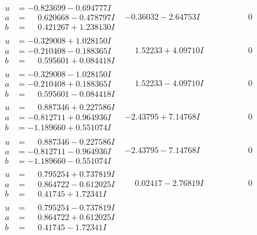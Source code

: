 \documentclass[1p]{elsarticle_modified}
\theoremstyle{definition}
\begin{document}
$$\begin{array}{c|c|c}
\begin{aligned}
u &= -0.823699 - 0.694777 I \\
a &= \phantom{-}0.620668 - 0.478797 I \\
b &= \phantom{-}0.421267 + 1.238130 I\end{aligned}
 & -0.36032 - 2.64753 I & \phantom{-0.000000 } 0 \\ \hline\begin{aligned}
u &= -0.329008 + 1.028150 I \\
a &= -0.210408 - 0.188365 I \\
b &= \phantom{-}0.595601 + 0.084418 I\end{aligned}
 & \phantom{-}1.52233 + 4.09710 I & \phantom{-0.000000 } 0 \\ \hline\begin{aligned}
u &= -0.329008 - 1.028150 I \\
a &= -0.210408 + 0.188365 I \\
b &= \phantom{-}0.595601 - 0.084418 I\end{aligned}
 & \phantom{-}1.52233 - 4.09710 I & \phantom{-0.000000 } 0 \\ \hline\begin{aligned}
u &= \phantom{-}0.887346 + 0.227586 I \\
a &= -0.812711 + 0.964936 I \\
b &= -1.189660 + 0.551074 I\end{aligned}
 & -2.43795 + 7.14768 I & \phantom{-0.000000 } 0 \\ \hline\begin{aligned}
u &= \phantom{-}0.887346 - 0.227586 I \\
a &= -0.812711 - 0.964936 I \\
b &= -1.189660 - 0.551074 I\end{aligned}
 & -2.43795 - 7.14768 I & \phantom{-0.000000 } 0 \\ \hline\begin{aligned}
u &= \phantom{-}0.795254 + 0.737819 I \\
a &= \phantom{-}0.864722 - 0.612025 I \\
b &= \phantom{-}0.41745 + 1.72341 I\end{aligned}
 & \phantom{-}0.02417 - 2.76819 I & \phantom{-0.000000 } 0 \\ \hline\begin{aligned}
u &= \phantom{-}0.795254 - 0.737819 I \\
a &= \phantom{-}0.864722 + 0.612025 I \\
b &= \phantom{-}0.41745 - 1.72341 I\end{aligned}

\end{array}$$
\end{document}
